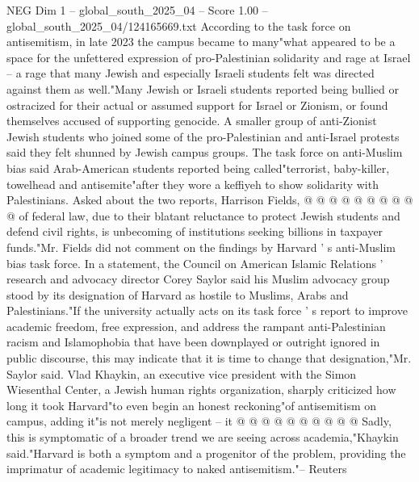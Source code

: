 \begin{textsample}{NEG Dim 1 – global\_south\_2025\_04 – Score 1.00 – global\_south\_2025\_04/124165669.txt}
According to the task force on antisemitism, in late 2023 the campus became to many"what appeared to be a space for the unfettered expression of pro-Palestinian solidarity and rage at Israel -- a rage that many Jewish and especially Israeli students felt was directed against them as well."Many Jewish or Israeli students reported being bullied or ostracized for their actual or assumed support for Israel or Zionism, or found themselves accused of supporting genocide.
A smaller group of anti-Zionist Jewish students who joined some of the pro-Palestinian and anti-Israel protests said they felt shunned by Jewish campus groups.
The task force on anti-Muslim bias said Arab-American students reported being called"terrorist, baby-killer, towelhead and antisemite"after they wore a keffiyeh to show solidarity with Palestinians.
Asked about the two reports, Harrison Fields, @ @ @ @ @ @ @ @ @ @ of federal law, due to their blatant reluctance to protect Jewish students and defend civil rights, is unbecoming of institutions seeking billions in taxpayer funds."Mr.
Fields did not comment on the findings by Harvard ' s anti-Muslim bias task force.
In a statement, the Council on American Islamic Relations ' research and advocacy director Corey Saylor said his Muslim advocacy group stood by its designation of Harvard as hostile to Muslims, Arabs and Palestinians."If the university actually acts on its task force ' s report to improve academic freedom, free expression, and address the rampant anti-Palestinian racism and Islamophobia that have been downplayed or outright ignored in public discourse, this may indicate that it is time to change that designation,"Mr.
Saylor said.
Vlad Khaykin, an executive vice president with the Simon Wiesenthal Center, a Jewish human rights organization, sharply criticized how long it took Harvard"to even begin an honest reckoning"of antisemitism on campus, adding it"is not merely negligent -- it @ @ @ @ @ @ @ @ @ @ Sadly, this is symptomatic of a broader trend we are seeing across academia,"Khaykin said."Harvard is both a symptom and a progenitor of the problem, providing the imprimatur of academic legitimacy to naked antisemitism."-- Reuters

\end{textsample}
